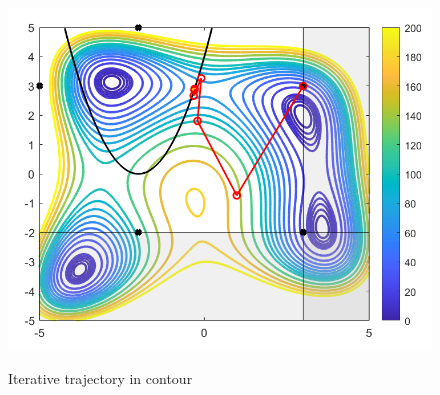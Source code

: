 \begin{figure}[H]
{\includegraphics[scale=0.4]{figures/SQP_BFGS_LINE_C.PNG}
}
\quad
{}
\quad
{}
\caption{ Iterative trajectory in contour}
\end{figure}
